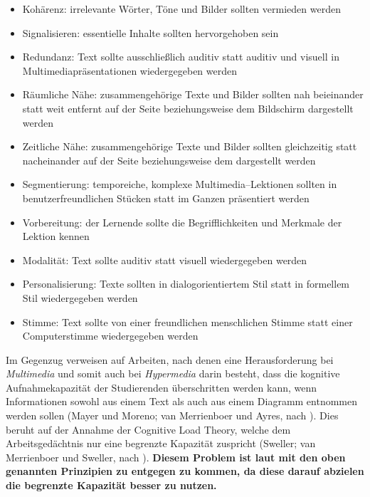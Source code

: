 \begin{itemize}
 \item  Kohärenz: irrelevante Wörter, Töne und Bilder sollten vermieden werden
 \item	Signalisieren: essentielle Inhalte sollten hervorgehoben sein
 \item	Redundanz: Text sollte ausschließlich auditiv statt auditiv und visuell in Multimediapräsentationen wiedergegeben werden
 \item	Räumliche Nähe: zusammengehörige Texte und Bilder sollten nah beieinander statt weit entfernt auf der Seite beziehungsweise dem Bildschirm dargestellt werden
 \item	Zeitliche Nähe: zusammengehörige Texte und Bilder sollten gleichzeitig statt nacheinander auf der Seite beziehungsweise dem dargestellt werden
 \item	Segmentierung: temporeiche, komplexe Multimedia–Lektionen sollten in benutzerfreundlichen Stücken statt im Ganzen präsentiert werden
 \item	Vorbereitung: der Lernende sollte die Begrifflichkeiten und Merkmale der Lektion kennen
 \item	Modalität: Text sollte auditiv statt visuell wiedergegeben werden
 \item	Personalisierung: Texte sollten in dialogorientiertem Stil statt in formellem Stil wiedergegeben werden
 \item	Stimme: Text sollte von einer freundlichen menschlichen Stimme statt einer Computerstimme wiedergegeben werden
\end{itemize}


Im Gegenzug verweisen \cite{moos2010multimedia} auf Arbeiten, nach denen eine Herausforderung bei \textit{Multimedia} und somit auch bei \textit{Hypermedia} darin besteht, dass die kognitive Aufnahmekapazität der Studierenden überschritten werden kann, wenn Informationen sowohl aus einem Text als auch aus einem Diagramm entnommen werden sollen (Mayer und Moreno; van Merrienboer und Ayres, nach \cite{moos2010multimedia}). Dies beruht auf der Annahme der Cognitive Load Theory, welche dem Arbeitsgedächtnis nur eine begrenzte Kapazität zuspricht (Sweller; van Merrienboer und Sweller, nach \cite{moos2010multimedia}). \textbf{Diesem Problem ist laut \cite{mayer2009multimedia} mit den oben genannten Prinzipien zu entgegen zu kommen, da diese darauf abzielen die begrenzte Kapazität besser zu nutzen.}

